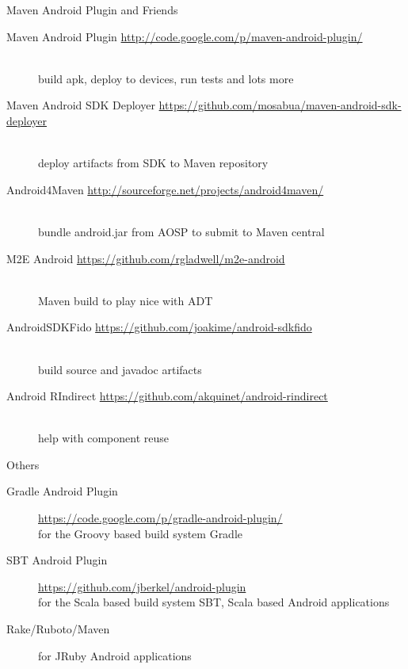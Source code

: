 \documentclass[aspectratio=169]{beamer}
\newcommand{\surl}[1] {{\tiny \url{#1}}}
\begin{document}
    \begin{frame}{Maven Android Plugin and Friends}
      \begin{description}
       \item[Maven Android Plugin \surl{http://code.google.com/p/maven-android-plugin/}] \hfill \\ build apk, deploy to devices, run tests and lots more
       \item[Maven Android SDK Deployer \surl{https://github.com/mosabua/maven-android-sdk-deployer}] \hfill \\ deploy artifacts from SDK to Maven repository
       \item[Android4Maven \surl{http://sourceforge.net/projects/android4maven/}] \hfill \\ bundle android.jar from AOSP to submit to Maven central
       \item[M2E Android \surl{https://github.com/rgladwell/m2e-android}] \hfill \\ Maven build to play nice with ADT
       \item[AndroidSDKFido \surl{https://github.com/joakime/android-sdkfido}] \hfill \\  build source and javadoc artifacts
       \item[Android RIndirect \surl{https://github.com/akquinet/android-rindirect}] \hfill \\  help with component reuse
      \end{description}
    \end{frame}

    \begin{frame}{Others}
      \begin{description}
        \item[Gradle Android Plugin] \surl{https://code.google.com/p/gradle-android-plugin/} \hfill \\ for the Groovy based build system Gradle
        \item[SBT Android Plugin] \surl{https://github.com/jberkel/android-plugin} \hfill \\ for the Scala based build system SBT, Scala based Android applications
        \item[Rake/Ruboto/Maven] for JRuby Android applications 
      \end{description}
    \end{frame}
\end{document}
